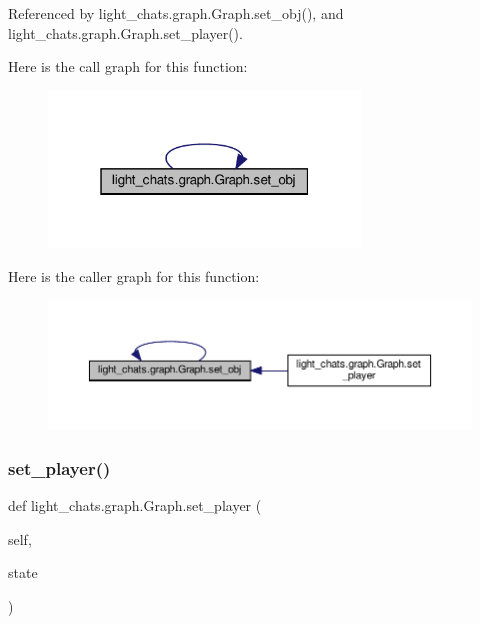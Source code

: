 Referenced by light\+\_\+chats.\+graph.\+Graph.\+set\+\_\+obj(), and light\+\_\+chats.\+graph.\+Graph.\+set\+\_\+player().

Here is the call graph for this function\+:
\nopagebreak
\begin{figure}[H]
\begin{center}
\leavevmode
\includegraphics[width=235pt]{classlight__chats_1_1graph_1_1Graph_ac46849fddce61ce035feb6ea683b9009_cgraph}
\end{center}
\end{figure}
Here is the caller graph for this function\+:
\nopagebreak
\begin{figure}[H]
\begin{center}
\leavevmode
\includegraphics[width=350pt]{classlight__chats_1_1graph_1_1Graph_ac46849fddce61ce035feb6ea683b9009_icgraph}
\end{center}
\end{figure}
\mbox{\label{classlight__chats_1_1graph_1_1Graph_a4130e8f504f9a6eeafbc83a8a38a6efb}} 
\subsubsection{\texorpdfstring{set\+\_\+player()}{set\_player()}}
{\footnotesize\ttfamily def light\+\_\+chats.\+graph.\+Graph.\+set\+\_\+player (\begin{DoxyParamCaption}\item[{}]{self,  }\item[{}]{state }\end{DoxyParamCaption})}

